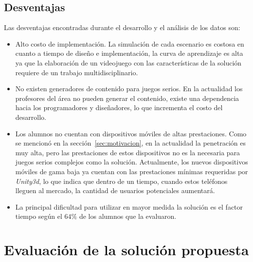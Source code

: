 \subsection{Desventajas}

Las desventajas encontradas durante el desarrollo y el análisis de los datos son:

\begin{itemize}

\item Alto costo de implementación. La simulación de cada escenario es costosa en cuanto a tiempo de diseño e implementación, la curva de aprendizaje es alta ya que la elaboración de un videojuego con las características de la solución requiere de un trabajo multidisciplinario.

\item No existen generadores de contenido para juegos serios. En la actualidad los profesores del área no pueden generar el contenido, existe una dependencia hacia los programadores y diseñadores, lo que incrementa el costo del desarrollo.

\item Los alumnos no cuentan con dispositivos móviles de altas prestaciones. Como se mencionó en la sección~\ref{sec:motivacion}, en la actualidad la penetración es muy alta, pero las prestaciones de estos dispositivos no es la necesaria para juegos serios complejos como la solución. Actualmente, los nuevos dispositivos móviles de gama baja ya cuentan con las prestaciones mínimas requeridas por \textit{Unity3d}, lo que indica que dentro de un tiempo, cuando estos teléfonos lleguen al mercado, la cantidad de usuarios potenciales aumentará.


\item La principal dificultad para utilizar en mayor medida la solución es el factor tiempo según el $64\%$ de los alumnos que la evaluaron.

\end{itemize}

\section[Evaluación de solución propuesta]%
{Evaluación de la solución propuesta}

